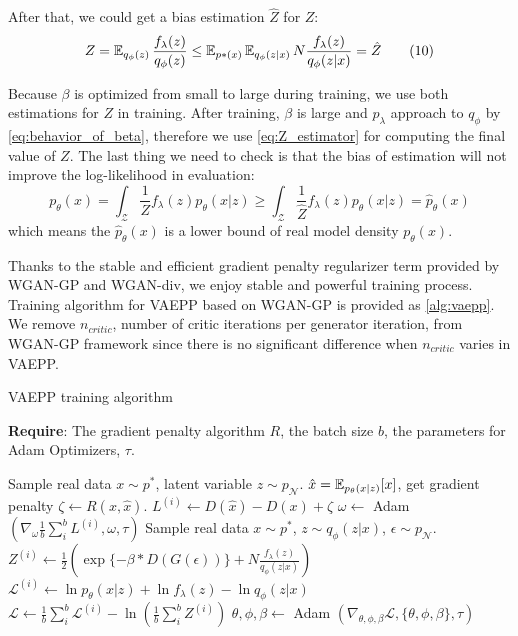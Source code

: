 After that, we could get a bias estimation $\hat{Z}$ for $Z$:
\begin{align*}\label{eq:Z_estimator}
	Z = \operatorname{\mathbb{E}}_{q_\phi(z)}\frac{f_\lambda(z)}{q_\phi(z)} \leq \operatorname{\mathbb{E}}_{p*(x)}\operatorname{\mathbb{E}}_{q_\phi(z|x)} N \frac{f_\lambda(z)}{q_\phi(z|x)} = \hat{Z} \tag{10}
\end{align*}

Because $\beta$ is optimized from small to large during training, we use both estimations for $Z$ in training. After training, $\beta$ is large and $p_\lambda$ approach to $q_\phi$ by \cref{eq:behavior_of_beta}, therefore we use \cref{eq:Z_estimator} for computing the final value of $Z$. The last thing we need to check is that the bias of estimation will not improve the log-likelihood in evaluation:
\begin{equation*}
	p_\theta(x) = \int_{\mathcal{Z}} \frac{1}{Z} f_\lambda(z) p_\theta(x|z) \geq \int_{\mathcal{Z}} \frac{1}{\hat{Z}} f_\lambda(z) p_\theta(x|z) = \hat{p}_\theta(x)
\end{equation*}
which means the $\hat{p}_\theta(x)$ is a lower bound of real model density $p_\theta(x)$.  

Thanks to the stable and efficient gradient penalty regularizer term provided by WGAN-GP and WGAN-div, we enjoy stable and powerful training process. Training algorithm for VAEPP based on WGAN-GP is provided as \cref{alg:vaepp}. We remove $n_{critic}$, number of critic iterations per generator iteration, from WGAN-GP framework since there is no significant difference when $n_{critic}$ varies in VAEPP.
\begin{algorithm}[tb]
\caption{VAEPP training algorithm}
\label{alg:vaepp}
\textbf{Require}: The gradient penalty algorithm $R$, the batch size $b$, the parameters for Adam Optimizers, $\tau$. 

\begin{algorithmic}[1] %
\STATE Sample real data $x \sim p^*$, latent variable $z \sim p_\mathcal{N}$.
\STATE	$\hat{x} = \operatorname{\mathbb{E}}_{p_\theta(x|z)}[x]$, get gradient penalty $\zeta \gets R(x, \hat{x})$. 
\STATE $L^{(i)} \gets D(\hat{x}) - D(x) + \zeta$
\ENDFOR
\STATE $\omega \gets $ Adam $(\nabla_{\omega} \frac{1}{b}\sum_{i}^b L^{(i)}, \omega, \tau)$
\STATE Sample real data $x \sim p^*$, $z \sim q_\phi(z|x)$, $\epsilon \sim p_\mathcal{N}$.
\STATE $Z^{(i)} \gets \frac{1}{2}(\exp\{-\beta * D(G(\epsilon))\} + N \frac{f_\lambda(z)}{q_\phi(z|x)})$
\STATE $\mathcal{L}^{(i)} \gets \ln p_\theta(x|z) + \ln f_\lambda(z) - \ln q_\phi(z|x)$
\ENDFOR
\STATE $\mathcal{L} \gets \frac{1}{b}\sum_{i}^b \mathcal{L}^{(i)} - \ln (\frac{1}{b}\sum_{i}^b Z^{(i)})$
\STATE $\theta, \phi, \beta \gets $ Adam $(\nabla_{\theta, \phi, \beta} \mathcal{L}, \{\theta, \phi, \beta\}, \tau)$
\ENDWHILE
\end{algorithmic}
\end{algorithm}

